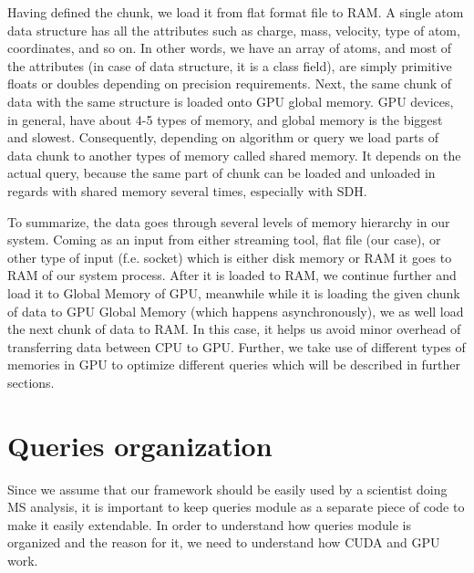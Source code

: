 \documentclass[11pt,a4paper]{report}
\begin{document}
Having defined the chunk, we load it from flat format file to RAM. A single atom data structure has all the attributes such as charge, mass, velocity, type of atom, coordinates, and so on. In other words, we have an array of atoms, and most of the attributes (in case of data structure, it is a class field), are simply primitive floats or doubles depending on precision requirements. Next, the same chunk of data with the same structure is loaded onto GPU global memory. GPU devices, in general, have about 4-5 types of memory, and global memory is the biggest and slowest. Consequently, depending on algorithm or query we load parts of data chunk to another types of memory called shared memory. It depends on the actual query, because the same part of chunk can be loaded and unloaded in regards with shared memory several times, especially with SDH.

To summarize, the data goes through several levels of memory hierarchy in our system. Coming as an input from either streaming tool, flat file (our case), or other type of input (f.e. socket) which is either disk memory or RAM it goes to RAM of our system process. After it is loaded to RAM, we continue further and load it to Global Memory of GPU, meanwhile while it is loading the given chunk of data to GPU Global Memory (which happens asynchronously), we as well load the next chunk of data to RAM. In this case, it helps us avoid minor overhead of transferring data between CPU to GPU. Further, we take use of different types of memories in GPU to optimize different queries which will be described in further sections.

\section{Queries organization}

Since we assume that our framework should be easily used by a scientist doing MS analysis, it is important to keep queries module as a separate piece of code to make it easily extendable. In order to understand how queries module is organized and the reason for it, we need to understand how CUDA and GPU work.
\end{document}
